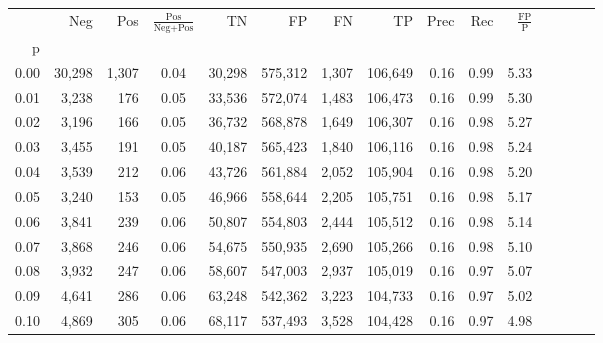 \begin{tabular}{rrrcrrrrrrrrrrr}
\toprule
{} &     Neg &    Pos & $\frac{\text{Pos}}{\text{Neg}+\text{Pos}}$ &       TN &       FP &       FN &       TP &  Prec &   Rec & $\frac{\text{FP}}{\text{P}}$ \\
p    &         &        &                                            &          &          &          &          &       &       &                              \\
\midrule
0.00 &  30,298 &  1,307 &                                       0.04 &   30,298 &  575,312 &    1,307 &  106,649 &  0.16 &  0.99 &                         5.33 \\
0.01 &   3,238 &    176 &                                       0.05 &   33,536 &  572,074 &    1,483 &  106,473 &  0.16 &  0.99 &                         5.30 \\
0.02 &   3,196 &    166 &                                       0.05 &   36,732 &  568,878 &    1,649 &  106,307 &  0.16 &  0.98 &                         5.27 \\
0.03 &   3,455 &    191 &                                       0.05 &   40,187 &  565,423 &    1,840 &  106,116 &  0.16 &  0.98 &                         5.24 \\
0.04 &   3,539 &    212 &                                       0.06 &   43,726 &  561,884 &    2,052 &  105,904 &  0.16 &  0.98 &                         5.20 \\
0.05 &   3,240 &    153 &                                       0.05 &   46,966 &  558,644 &    2,205 &  105,751 &  0.16 &  0.98 &                         5.17 \\
0.06 &   3,841 &    239 &                                       0.06 &   50,807 &  554,803 &    2,444 &  105,512 &  0.16 &  0.98 &                         5.14 \\
0.07 &   3,868 &    246 &                                       0.06 &   54,675 &  550,935 &    2,690 &  105,266 &  0.16 &  0.98 &                         5.10 \\
0.08 &   3,932 &    247 &                                       0.06 &   58,607 &  547,003 &    2,937 &  105,019 &  0.16 &  0.97 &                         5.07 \\
0.09 &   4,641 &    286 &                                       0.06 &   63,248 &  542,362 &    3,223 &  104,733 &  0.16 &  0.97 &                         5.02 \\
0.10 &   4,869 &    305 &                                       0.06 &   68,117 &  537,493 &    3,528 &  104,428 &  0.16 &  0.97 &                         4.98 \\

\end{tabular}
